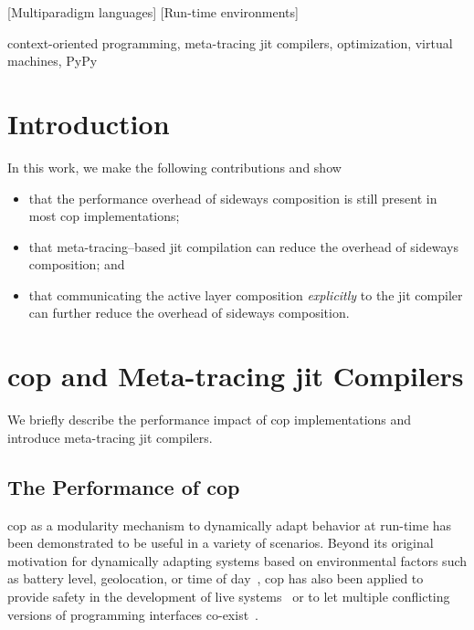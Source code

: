 \documentclass[preprint,english,10pt,nonatbib]{sigplanconf}
\begin{document}
[Mul\-ti\-par\-a\-digm languages]
[Run-time environments]

\keywords
context-oriented programming,
meta-tracing \acs{jit} compilers,
optimization,
virtual machines,
PyPy

\section{Introduction}




In this work, we make the following contributions and show
\begin{itemize}
\item that the performance overhead of sideways composition is still
  present in most \ac{cop} implementations;
\item that meta-tracing--based \ac{jit} compilation can reduce the
  overhead of sideways composition; and
\item that communicating the active layer composition \emph{explicitly} to the
  \ac{jit} compiler can further reduce the overhead of sideways composition.
\end{itemize}


\section{\protect\Acs{cop} and Meta-tracing \acs{jit} Compilers}

We briefly describe the performance impact of \ac{cop} implementations and
introduce meta-tracing \ac{jit} compilers.

\subsection{The Performance of \acs{cop}}
\label{sec:performance-cop}
\ac{cop} as a modularity mechanism to dynamically adapt behavior at run-time has
been demonstrated to be useful in a variety of scenarios. Beyond its original
motivation for dynamically adapting systems based on environmental factors such
as battery level, geolocation, or time of day~, \ac{cop} has also
been applied to provide safety in the development of live
systems~\cite{lincke+:2012:scoping-changes} or to let multiple conflicting
versions of programming interfaces co-exist~.
\end{document}
